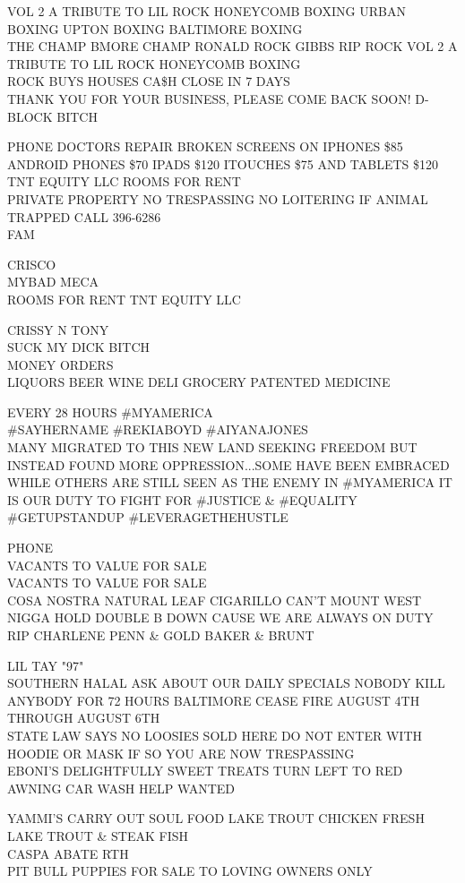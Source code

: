 \documentclass[10pt,letterpaper]{article}
\begin{document}
VOL 2 A TRIBUTE TO LIL ROCK HONEYCOMB BOXING URBAN BOXING UPTON BOXING BALTIMORE BOXING\\
THE CHAMP BMORE CHAMP RONALD ROCK GIBBS RIP ROCK VOL 2 A TRIBUTE TO LIL ROCK HONEYCOMB BOXING\\
ROCK BUYS HOUSES CA\$H CLOSE IN 7 DAYS\\
THANK YOU FOR YOUR BUSINESS, PLEASE COME BACK SOON!  D{-}BLOCK BITCH

PHONE DOCTORS REPAIR BROKEN SCREENS ON IPHONES \$85 ANDROID PHONES \$70 IPADS \$120 ITOUCHES \$75 AND TABLETS \$120\\
TNT EQUITY LLC ROOMS FOR RENT\\
PRIVATE PROPERTY NO TRESPASSING NO LOITERING IF ANIMAL TRAPPED CALL 396{-}6286\\
FAM

CRISCO\\
MYBAD MECA\\
ROOMS FOR RENT TNT EQUITY LLC

CRISSY N TONY\\
SUCK MY DICK BITCH\\
MONEY ORDERS\\
LIQUORS BEER WINE DELI GROCERY PATENTED MEDICINE

EVERY 28 HOURS \#MYAMERICA\\
\#SAYHERNAME \#REKIABOYD \#AIYANAJONES\\
MANY MIGRATED TO THIS NEW LAND SEEKING FREEDOM BUT INSTEAD FOUND MORE OPPRESSION...SOME HAVE BEEN EMBRACED WHILE OTHERS ARE STILL SEEN AS THE ENEMY IN \#MYAMERICA IT IS OUR DUTY TO FIGHT FOR \#JUSTICE \& \#EQUALITY \#GETUPSTANDUP \#LEVERAGETHEHUSTLE

PHONE\\
VACANTS TO VALUE FOR SALE\\
VACANTS TO VALUE FOR SALE\\
COSA NOSTRA NATURAL LEAF CIGARILLO CAN'T MOUNT WEST NIGGA HOLD DOUBLE B DOWN CAUSE WE ARE ALWAYS ON DUTY RIP CHARLENE PENN \& GOLD BAKER \& BRUNT

LIL TAY "97"\\
SOUTHERN HALAL ASK ABOUT OUR DAILY SPECIALS NOBODY KILL ANYBODY FOR 72 HOURS BALTIMORE CEASE FIRE AUGUST 4TH THROUGH AUGUST 6TH\\
STATE LAW SAYS NO LOOSIES SOLD HERE DO NOT ENTER WITH HOODIE OR MASK IF SO YOU ARE NOW TRESPASSING\\
EBONI'S DELIGHTFULLY SWEET TREATS TURN LEFT TO RED AWNING CAR WASH HELP WANTED

YAMMI'S CARRY OUT SOUL FOOD LAKE TROUT CHICKEN FRESH LAKE TROUT \& STEAK FISH\\
CASPA ABATE RTH\\
PIT BULL PUPPIES FOR SALE TO LOVING OWNERS ONLY
\end{document}
